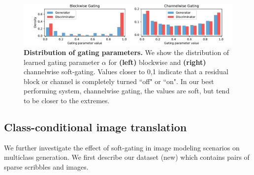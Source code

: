 \begin{figure}[t]%
    \centering
    \includegraphics[width=\linewidth,trim={.7cm 0 .8cm 0},clip]{paper_images/alpha_hist.pdf}\caption{ {\bf Distribution of gating parameters.} We show the distribution of learned gating parameter $\alpha$ for {\bf (left)} blockwise and {\bf (right)} channelwise soft-gating. Values closer to 0,1 indicate that a residual block or channel is completely turned ``off" or ``on". In our best performing system, channelwise gating, the values are soft, but tend to be closer to the extremes.}
    \label{fig:alpha_dist}
    \vspace{-3mm}
\end{figure}


\subsection{Class-conditional image translation}

\noindent We further investigate the effect of soft-gating in image modeling scenarios on multiclass generation. We first describe our dataset (new) which contains pairs of sparse scribbles and images.

